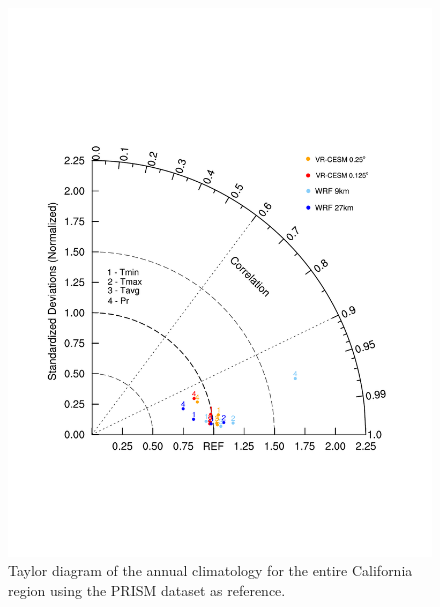 \documentclass[draft,ms]{agutex}   %
\begin{document}
\begin{figure}
\begin{center}
\includegraphics[width=6in]{taylor_diagram.pdf}
\end{center}
\caption{Taylor diagram of the annual climatology for the entire California region using the PRISM dataset as reference.} \label{fig:Figure 14}
\end{figure}
\end{document}
